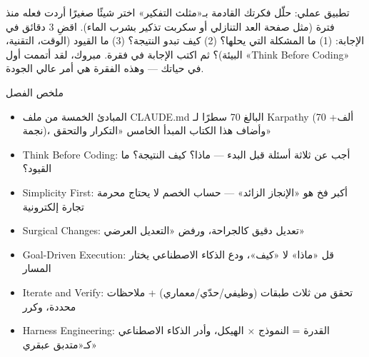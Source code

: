 \begin{tcbpractice}{تطبيق عملي: حلّل فكرتك القادمة بـ«مثلث التفكير»}
اختر شيئًا صغيرًا أردت فعله منذ فترة (مثل صفحة العد التنازلي أو سكربت تذكير بشرب الماء). اقضِ 3 دقائق في الإجابة: (1) ما المشكلة التي يحلها؟ (2) كيف تبدو النتيجة؟ (3) ما القيود (الوقت، التقنية، البيئة)؟ ثم اكتب الإجابة في فقرة. مبروك، لقد أتممت أول «Think Before Coding» في حياتك — وهذه الفقرة هي أمر عالي الجودة.

\end{tcbpractice}

\begin{tcbsummary}{ملخص الفصل}
\begin{itemize}
  \item المبادئ الخمسة من ملف CLAUDE.md البالغ 70 سطرًا لـ Karpathy (70 ألف+ نجمة)، وأضاف هذا الكتاب المبدأ الخامس «التكرار والتحقق»
  \item Think Before Coding: أجب عن ثلاثة أسئلة قبل البدء — ماذا؟ كيف النتيجة؟ ما القيود؟
  \item Simplicity First: أكبر فخ هو «الإنجاز الزائد» — حساب الخصم لا يحتاج محرمة تجارة إلكترونية
  \item Surgical Changes: تعديل دقيق كالجراحة، ورفض «التعديل العرضي»
  \item Goal-Driven Execution: قل «ماذا» لا «كيف»، ودع الذكاء الاصطناعي يختار المسار
  \item Iterate and Verify: تحقق من ثلاث طبقات (وظيفي/حدّي/معماري) + ملاحظات محددة، وكرر
  \item Harness Engineering: القدرة = النموذج × الهيكل، وأدر الذكاء الاصطناعي كـ«متدبق عبقري»
\end{itemize}

\end{tcbsummary}
